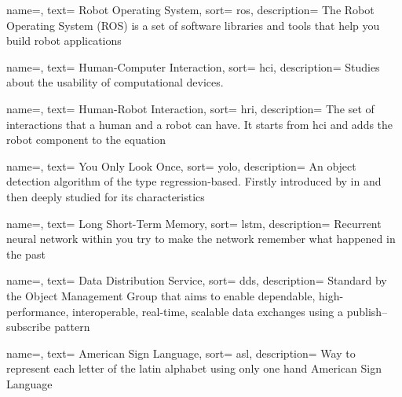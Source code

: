 {
  name=,
  text= Robot Operating System,
  sort= ros,
  description= {The Robot Operating System (ROS) is a set of software libraries and tools that help you build robot applications~\cite{site:ros}}
}

{
  name=,
  text= Human-Computer Interaction,
  sort= hci,
  description= {Studies about the usability of computational devices.}
}

{
  name=,
  text= Human-Robot Interaction,
  sort= hri,
  description= {The set of interactions that a human and a robot can have. It starts from \gls{hci} and adds the robot component to the equation}
}

{
  name=,
  text= You Only Look Once,
  sort= yolo,
  description= {An object detection algorithm of the type regression-based. Firstly introduced by \citeauthor{paper:yolov1}\cite{paper:yolov1} in \citeyear{paper:yolov1} and then deeply studied for its characteristics}
}

{
  name=,
  text= Long Short-Term Memory,
  sort= lstm,
  description= {Recurrent neural network within you try to make the network remember what happened in the past}
}

{
  name=,
  text= Data Distribution Service,
  sort= dds,
  description= {Standard by the Object Management Group that aims to enable dependable, high-performance, interoperable, real-time, scalable data exchanges using a publish–subscribe pattern}
}

{
  name=,
  text= American Sign Language,
  sort= asl,
  description= {Way to represent each letter of the latin alphabet using only one hand}
}
 {American Sign Language}

